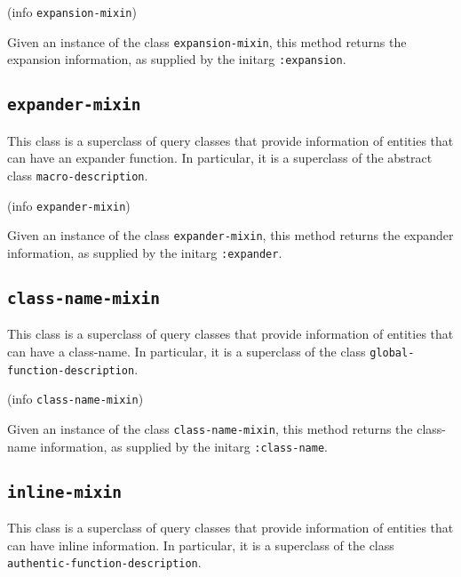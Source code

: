 
 {(info {\tt expansion-mixin})}

Given an instance of the class \texttt{expansion-mixin}, this method
returns the expansion information, as supplied by the initarg
\texttt{:expansion}.

\subsection{\texttt{expander-mixin}}
\label{sec-expander-mixin}

This class is a superclass of query classes that provide information
of entities that can have an expander function.  In particular, it is
a superclass of the abstract class \texttt{macro-description}.


 {(info {\tt expander-mixin})}

Given an instance of the class \texttt{expander-mixin}, this method
returns the expander information, as supplied by the initarg
\texttt{:expander}.

\subsection{\texttt{class-name-mixin}}
\label{sec-class-name-mixin}

This class is a superclass of query classes that provide information
of entities that can have a class-name.  In particular, it is a
superclass of the class \texttt{global-function-description}.


 {(info {\tt class-name-mixin})}

Given an instance of the class \texttt{class-name-mixin}, this method
returns the class-name information, as supplied by the initarg
\texttt{:class-name}.

\subsection{\texttt{inline-mixin}}
\label{sec-inline-mixin}

This class is a superclass of query classes that provide information
of entities that can have inline information.  In particular, it is a
superclass of the class \texttt{authentic-function-description}.


